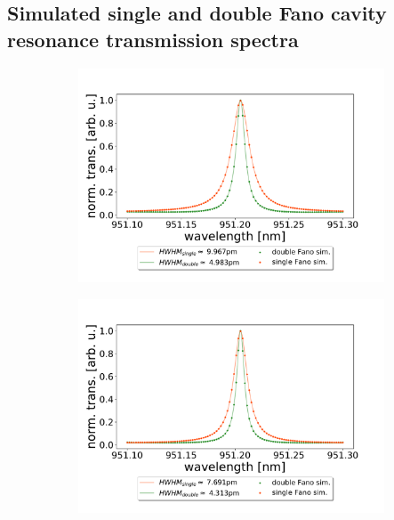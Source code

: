 \subsection{Simulated single and double Fano cavity resonance transmission spectra}

\begin{figure}[h!]
    \centering
    \begin{subfigure}[b]{0.49\textwidth}
        \includegraphics[width=\textwidth]{figures/sim_single_vs_double_10um.pdf}
        \caption{}
        \label{fig:single_vs_double_simulation_10um}
    \end{subfigure}
    \begin{subfigure}[b]{0.49\textwidth}
        \includegraphics[width=\textwidth]{figures/sim_single_vs_double_30um.pdf}
        \caption{}
        \label{fig:single_vs_double_simulation_30um}

\end{subfigure}
\end{figure}
